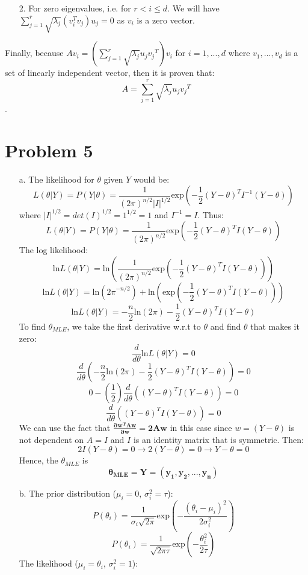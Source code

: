 \documentclass[twoside]{homework}
\begin{document}
\begin{itemize}
\begin{itemize}
        \item[2.] For zero eigenvalues, i.e. for $r<i\leq{d}$. We will have $\sum_{j=1}^r\sqrt{{\lambda}_j}(v_i^Tv_j)u_j = 0$ as $v_i$ is a zero vector.
    \end{itemize}
    Finally, because $Av_i=(\sum_{j=1}^r\sqrt{{\lambda}_j}u_j{v_j}^T)v_i$ for $i=1,...,d$ where $v_1,...,v_d$ is a set of linearly independent vector, then it is proven that:
    $$A=\sum_{j=1}^r\sqrt{{\lambda}_j}u_j{v_j}^T$$.
\end{itemize}
\newpage

\section*{Problem 5}
\begin{itemize}
    \item [a.] The likelihood for $\theta$ given $Y$ would be:
    $$L(\theta|Y)=P(Y|\theta)=\frac{1}{(2\pi)^{n/2}|I|^{1/2}}\text{exp}(-\frac{1}{2}(Y-\theta)^TI^{-1}(Y-\theta))$$
    where $|I|^{1/2}=det(I)^{1/2}=1^{1/2}=1$ and $I^{-1}=I$. Thus:
    $$L(\theta|Y)=P(Y|\theta)=\frac{1}{(2\pi)^{n/2}}\text{exp}(-\frac{1}{2}(Y-\theta)^TI(Y-\theta))$$
    The log likelihood:
    $$\text{ln}L(\theta|Y)=\text{ln}(\frac{1}{(2\pi)^{n/2}}\text{exp}(-\frac{1}{2}(Y-\theta)^TI(Y-\theta)))$$
    $$\text{ln}L(\theta|Y)=\text{ln}({2\pi}^{-n/2})+\text{ln}(\text{exp}(-\frac{1}{2}(Y-\theta)^TI(Y-\theta)))$$
    $$\text{ln}L(\theta|Y)=-\frac{n}{2}\text{ln}(2\pi)-\frac{1}{2}(Y-\theta)^TI(Y-\theta)$$
    To find $\theta_{MLE}$, we take the first derivative w.r.t to $\theta$ and find $\theta$ that makes it zero:
    $$\frac{d}{d\theta}\text{ln}L(\theta|Y)=0$$
    $$\frac{d}{d\theta}(-\frac{n}{2}\text{ln}(2\pi)-\frac{1}{2}(Y-\theta)^TI(Y-\theta))=0$$
    $$0-(\frac{1}{2})\frac{d}{d\theta}((Y-\theta)^TI(Y-\theta))=0$$
    $$\frac{d}{d\theta}((Y-\theta)^TI(Y-\theta))=0$$
    We can use the fact that $\mathbf{ \frac{\partial w^T A w}{\partial w} = 2Aw}$ in this case since $w=(Y-\theta)$ is not dependent on $A=I$ and $I$ is an identity matrix that is symmetric. Then:
    $$2I(Y-\theta)=0 \xrightarrow{} 2(Y-\theta)=0 \xrightarrow{} Y-\theta=0$$
    Hence, the $\theta_{MLE}$ is
    $$\boldsymbol{\theta_{MLE}=Y=(y_1, y_2, ..., y_n)}$$
    \item [b.] The prior distribution ($\mu_i=0$, $\sigma^2_i=\tau$):
    $$P(\theta_i)=\frac{1}{\sigma_i\sqrt{2\pi}}\text{exp}(-\frac{(\theta_i-\mu_i)^2}{2\sigma_i^2})$$
    $$P(\theta_i)=\frac{1}{\sqrt{2\pi\tau}}\text{exp}(-\frac{\theta_i^2}{2\tau})$$
    The likelihood ($\mu_i=\theta_i$, $\sigma_i^2=1$):

\end{itemize}
\end{document}
